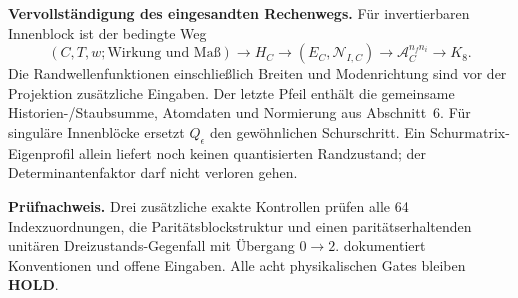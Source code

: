 \documentclass[10pt,a4paper]{article}
\newcommand{\status}[1]{\textsf{\textbf{#1}}}
\begin{document}
\textbf{Vervollständigung des eingesandten Rechenwegs.}
Für invertierbaren Innenblock ist der bedingte Weg
\[
(C,T,w;\text{Wirkung und Maß})\longrightarrow H_C
\longrightarrow(E_C,\mathcal N_{I,C})
\longrightarrow\mathcal A_C^{n_fn_i}
\longrightarrow K_8.
\]
Die Randwellenfunktionen einschließlich Breiten und Modenrichtung sind vor
der Projektion zusätzliche Eingaben. Der letzte Pfeil enthält die gemeinsame
Historien-/Staubsumme, Atomdaten und Normierung aus Abschnitt~6.
Für singuläre Innenblöcke ersetzt $Q_\epsilon$ den gewöhnlichen Schurschritt.
Ein Schurmatrix-Eigenprofil allein liefert noch keinen quantisierten
Randzustand; der Determinantenfaktor darf nicht verloren gehen.

\textbf{Prüfnachweis.} Drei zusätzliche exakte Kontrollen prüfen alle
64 Indexzuordnungen, die Paritätsblockstruktur und einen paritätserhaltenden
unitären Dreizustands-Gegenfall mit Übergang $0\to2$.
 dokumentiert Konventionen und offene Eingaben.
Alle acht physikalischen Gates bleiben \status{HOLD}.
\end{document}
